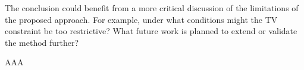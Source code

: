 \begin{point}
	The conclusion could benefit from a more critical discussion of the limitations of the proposed approach. For example, under what conditions might the TV constraint be too restrictive? What future work is planned to extend or validate the method further?
\end{point}

\begin{reply}
	AAA
\end{reply}

